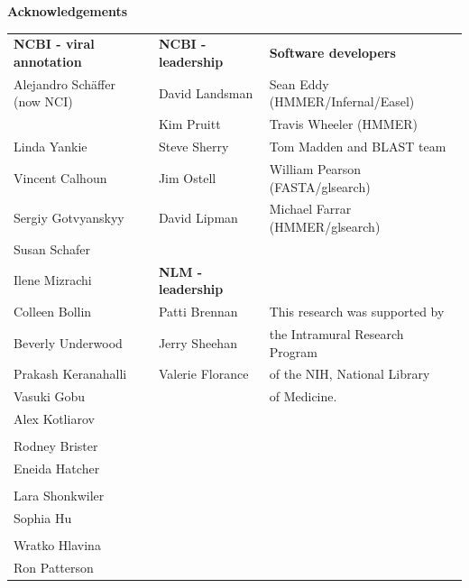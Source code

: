 \documentclass[landscape]{slides}
\begin{document}
\begin{slide}

\large
\begin{center}
\large{\textbf{Acknowledgements}} \\

\normalsize
\vspace{0.75in}

\small
\begin{tabular}{l|l|l}
\textbf{NCBI - viral annotation} & \textbf{NCBI - leadership} &  \textbf{Software developers} \\
Alejandro Sch\"{a}ffer (now NCI) & David Landsman             & Sean Eddy (HMMER/Infernal/Easel)\\
                                 & Kim Pruitt                 & Travis Wheeler (HMMER)\\
Linda Yankie                     & Steve Sherry               & Tom Madden and BLAST team \\
Vincent Calhoun                  & Jim Ostell                 & William Pearson (FASTA/glsearch) \\
Sergiy Gotvyanskyy               & David Lipman               & Michael Farrar (HMMER/glsearch) \\
Susan Schafer                    &                            & \\
Ilene Mizrachi                   & \textbf{NLM - leadership}  & \\
Colleen Bollin                   & Patti Brennan              & This research was supported by \\
Beverly Underwood                & Jerry Sheehan              & the Intramural Research Program \\
Prakash Keranahalli              & Valerie Florance           & of the NIH, National Library \\
Vasuki Gobu                      &                            & of Medicine. \\
Alex Kotliarov                   & & \\
& & \\
Rodney Brister                   & & \\
Eneida Hatcher                   & & \\
& & \\
Lara Shonkwiler                  & & \\
Sophia Hu                        & & \\
& & \\
Wratko Hlavina                   & & \\
Ron Patterson                    & & \\
\end{tabular}


\end{center}
\end{slide}
\end{document}
